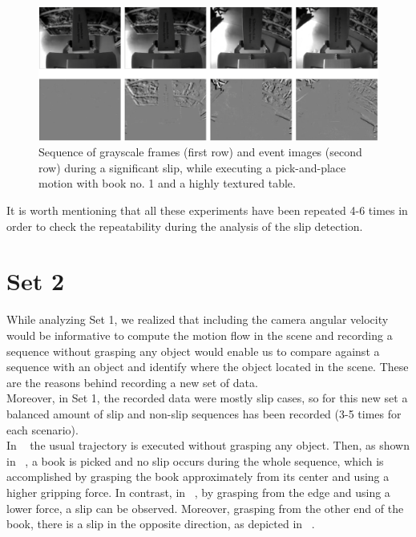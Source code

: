 \begin{figure}[H]
    \centering
    \includegraphics[width=\textwidth]{resources/images/set1_case7}
    \caption{Sequence of grayscale frames (first row) and event images (second row) during a significant slip, while executing a pick-and-place motion with book no. 1 and a highly textured table.}\label{fig:set1_case7}
\end{figure}

It is worth mentioning that all these experiments have been repeated 4-6 times in order to check the repeatability during the analysis of the slip detection.

\section{Set 2}

While analyzing Set 1, we realized that including the camera angular velocity would be informative to compute the motion flow in the scene and recording a sequence without grasping any object would enable us to compare against a sequence with an object and identify where the object located in the scene. These are the reasons behind recording a new set of data.\\

Moreover, in Set 1, the recorded data were mostly slip cases, so for this new set a balanced amount of slip and non-slip sequences has been recorded (3-5 times for each scenario).\\

In ~ the usual trajectory is executed without grasping any object. Then, as shown in ~, a book is picked and no slip occurs during the whole sequence, which is accomplished by grasping the book approximately from its center and using a higher gripping force. In contrast, in ~, by grasping from the edge and using a lower force, a slip can be observed. Moreover, grasping from the other end of the book, there is a slip in the opposite direction, as depicted in ~.\\

